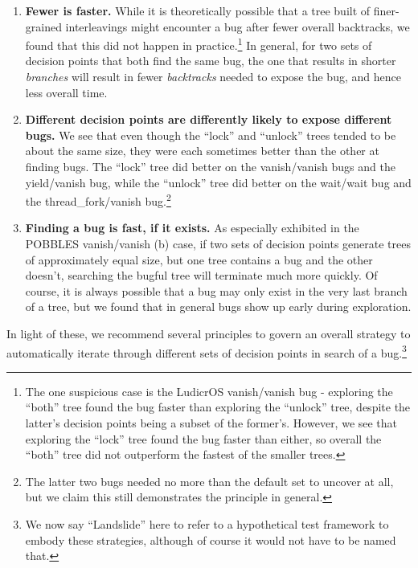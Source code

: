 \begin{enumerate}
	\item {\bf Fewer is faster.} While it is theoretically possible that a tree built of finer-grained interleavings might encounter a bug after fewer overall backtracks, we found that this did not happen in practice.\footnote{
		The one suspicious case is the LudicrOS vanish/vanish bug - exploring the ``both'' tree found the bug faster than exploring the ``unlock'' tree, despite the latter's decision points being a subset of the former's. However, we see that exploring the ``lock'' tree found the bug faster than either, so overall the ``both'' tree did not outperform the fastest of the smaller trees.}
		In general, for two sets of decision points that both find the same bug, the one that results in shorter {\em branches} will result in fewer {\em backtracks} needed to expose the bug, and hence less overall time.
	\item {\bf Different decision points are differently likely to expose different bugs.} We see that even though the ``lock'' and ``unlock'' trees tended to be about the same size, they were each sometimes better than the other at finding bugs. The ``lock'' tree did better on the vanish/vanish bugs and the yield/vanish bug, while the ``unlock'' tree did better on the wait/wait bug and the thread\_fork/vanish bug.\footnote{
	The latter two bugs needed no more than the default set to uncover at all, but we claim this still demonstrates the principle in general.}
	\item {\bf Finding a bug is fast, if it exists.} As especially exhibited in the POBBLES vanish/vanish (b) case, if two sets of decision points generate trees of approximately equal size, but one tree contains a bug and the other doesn't, searching the bugful tree will terminate much more quickly. Of course, it is always possible that a bug may only exist in the very last branch of a tree, but we found that in general bugs show up early during exploration.
\end{enumerate}


In light of these, we recommend several principles to govern an overall strategy to automatically iterate through different sets of decision points in search of a bug.\footnote{
We now say ``Landslide'' here to refer to a hypothetical test framework to embody these strategies, although of course it would not have to be named that.}

